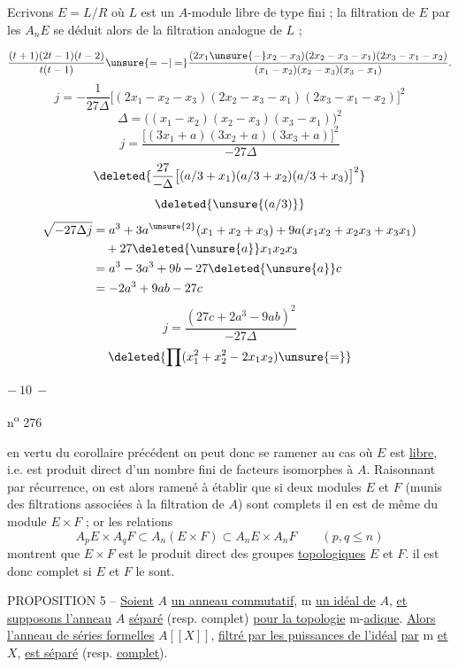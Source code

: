 Ecrivons $E=L/R$ où $L$ est un $A$-module libre de type fini ; la filtration de $E$ par les $A_nE$ se déduit alors de la filtration analogue de $L$ ;


\[
\frac{(t+1)(2t-1)(t-2)}{t(t-1)}\unsure{=-|=}\frac{(2x_1\unsure{-}x_2-x_3)(2x_2-x_3-x_1)(2x_3-x_1-x_2)}{(x_1-x_2)(x_2-x_3)(x_3-x_1)}.
\]
\[
\boxed{j=-\frac1{27\Delta}\bigl[(2x_1-x_2-x_3)(2x_2-x_3-x_1)(2x_3-x_1-x_2)\bigr]^2}
\]
\margin{\[
\sum x_1=-a\qquad\sum x_1x_2=b\qquad x_1x_2x_3=\unsure{-}c
\]}
\[
\Delta=\bigl((x_1-x_2)(x_2-x_3)(x_3-x_1)\bigr)^2
\]
\[
j=\frac{\bigl[(3x_1+a)(3x_2+a)(3x_3+a)\bigr]^2}{-27\Delta}
\]
\[
\deleted{\frac{27}{-\Delta}\bigl[(a/3+x_1)(a/3+x_2)(a/3+x_3)\bigr]^2}
\]
\[
\deleted{\unsure{(a/3)}}
\]
\[
\begin{aligned}
\sqrt{-27\Delta j}&=a^3+3a^{\unsure{2}}(x_1+x_2+x_3)+9a(x_1x_2+x_2x_3+x_3x_1)\\
&\quad+27\deleted{\unsure{a}}x_1x_2x_3\\
&=a^3-3a^3+9b-27\deleted{\unsure{a}}c\\
&=-2a^3+9ab-27c
\end{aligned}
\]
\[
\boxed{j=\frac{(27c+2a^3-9ab)^2}{-27\Delta}}
\]
\[
\deleted{\prod(x_1^2+x_2^2-2x_1x_2)\unsure{=}}
\]


\begin{center}$-\ 10\ -$\end{center}\hfill n\textsuperscript{o} 276

en vertu du corollaire précédent on peut donc se ramener au cas où $E$ est \uline{libre}, i.e. est produit direct d'un nombre fini de facteurs isomorphes à $A$. Raisonnant par récurrence, on est alors ramené à établir que si deux modules $E$ et $F$ (munis des filtrations associées à la filtration de $A$) sont complets il en est de même du module $E\times F$ ; or les relations
\[
A_pE\times A_qF\subset A_n(E\times F)\subset A_nE\times A_nF\qquad(p,q\leqslant n)
\]
montrent que $E\times F$ est le produit direct des groupes \uline{topologiques} $E$ et $F$. il est donc complet si $E$ et $F$ le sont.

PROPOSITION 5 -- \uline{Soient} $A$ \uline{un anneau commutatif}, $\mathrm m$ \uline{un idéal de} $A$, \uline{et supposons l'anneau} $A$ \uline{séparé} (resp. complet) \uline{pour la topologie} $\mathrm m$-\uline{adique}. \uline{Alors l'anneau de séries formelles} $A[[X]]$, \uline{filtré par les puissances de l'idéal}  \uline{par} $\mathrm m$ \uline{et} $X$, \uline{est séparé} (resp. \uline{complet}).

